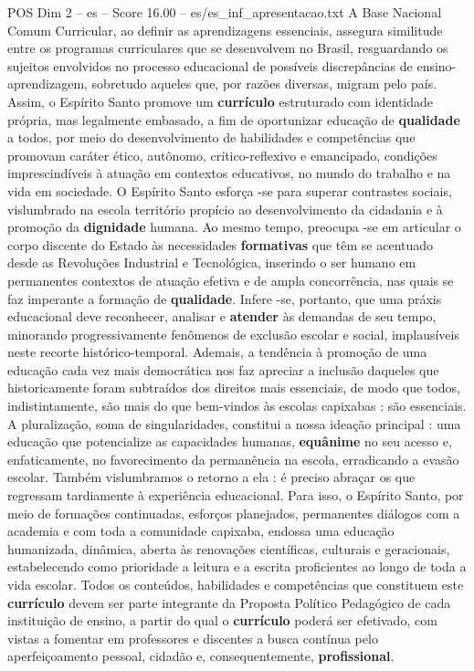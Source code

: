 \begin{textsample}{POS Dim 2 – es – Score 16.00 – es/es\_inf\_apresentacao.txt}
A Base Nacional Comum Curricular, ao definir as aprendizagens essenciais, assegura similitude entre os programas curriculares que se desenvolvem no Brasil, resguardando os sujeitos envolvidos no processo educacional de possíveis discrepâncias de ensino-aprendizagem, sobretudo aqueles que, por razões diversas, migram pelo país.
Assim, o Espírito Santo promove um \textbf{currículo} estruturado com identidade própria, mas legalmente embasado, a fim de oportunizar educação de \textbf{qualidade} a todos, por meio do desenvolvimento de habilidades e competências que promovam caráter ético, autônomo, crítico-reflexivo e emancipado, condições imprescindíveis à atuação em contextos educativos, no mundo do trabalho e na vida em sociedade.
O Espírito Santo esforça -se para superar contrastes sociais, vislumbrado na escola território propício ao desenvolvimento da cidadania e à promoção da \textbf{dignidade} humana.
Ao mesmo tempo, preocupa -se em articular o corpo discente do Estado às necessidades \textbf{formativas} que têm se acentuado desde as Revoluções Industrial e Tecnológica, inserindo o ser humano em permanentes contextos de atuação efetiva e de ampla concorrência, nas quais se faz imperante a formação de \textbf{qualidade}.
Infere -se, portanto, que uma práxis educacional deve reconhecer, analisar e \textbf{atender} às demandas de seu tempo, minorando progressivamente fenômenos de exclusão escolar e social, implausíveis neste recorte histórico-temporal.
Ademais, a tendência à promoção de uma educação cada vez mais democrática nos faz apreciar a inclusão daqueles que historicamente foram subtraídos dos direitos mais essenciais, de modo que todos, indistintamente, são mais do que bem-vindos às escolas capixabas : são essenciais.
A pluralização, soma de singularidades, constitui a nossa ideação principal : uma educação que potencialize as capacidades humanas, \textbf{equânime} no seu acesso e, enfaticamente, no favorecimento da permanência na escola, erradicando a evasão escolar.
Também vislumbramos o retorno a ela : é preciso abraçar os que regressam tardiamente à experiência educacional.
Para isso, o Espírito Santo, por meio de formações continuadas, esforços planejados, permanentes diálogos com a academia e com toda a comunidade capixaba, endossa uma educação humanizada, dinâmica, aberta às renovações científicas, culturais e geracionais, estabelecendo como prioridade a leitura e a escrita proficientes ao longo de toda a vida escolar.
Todos os conteúdos, habilidades e competências que constituem este \textbf{currículo} devem ser parte integrante da Proposta Político Pedagógico de cada instituição de ensino, a partir do qual o \textbf{currículo} poderá ser efetivado, com vistas a fomentar em professores e discentes a busca contínua pelo aperfeiçoamento pessoal, cidadão e, consequentemente, \textbf{profissional}.

\end{textsample}
